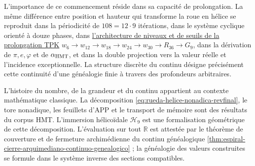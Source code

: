 L'importance de ce commencement réside dans sa capacité de prolongation. La
même différence entre position et hauteur qui transforme la roue en hélice se
reproduit dans la périodicité de \(108=12\cdot9\) itérations, dans le système
cyclique orienté à douze phases, dans
\hyperref[sec:umbrales-prolongacion-tpk-inaugural]{l'architecture de niveaux et de
seuils de la prolongation TPK}
\(w_6\to w_{12}\to w_{18}\to w_{24}\to w_{30}\to R_{36}\to G_9\), dans la dérivation de
\(\pi,e,\varphi\) et de \(\alpha_{\rm HMT}\), et dans la double projection vers la
valeur réelle et l'incidence exceptionnelle. La structure discrète du continu
désigne précisément cette continuité d'une généalogie finie à travers des
profondeurs arbitraires.

\begin{statusbox}
L'histoire du nombre, de la grandeur et du continu appartient au contexte mathématique
classique. La décomposition \eqref{eq:rueda-helice-nonadica-revfinal}, le tore
nonadique, les feuillets d'APP et le transport de mémoire sont des résultats du
corpus HMT. L'immersion hélicoïdale \(\mathcal H_9\) est une formalisation
géométrique de cette décomposition. L'évaluation sur tout \(\mathbb R\)
est attestée par le théorème de couverture et de fermeture archimédienne du
continu généalogique
\cref{thm:espiral-cierre-arquimediano-continuo-genealogico} ; la généalogie des
valeurs construites se formule dans le système inverse des sections
compatibles.
\end{statusbox}

